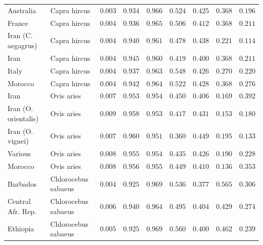 \documentclass{article}
\begin{document}
\begin{table}[tb]
\begin{adjustbox}{width=\textwidth}
\begin{tabular}{||l|l|r||r|r||r|r||r|r||}
                \rowcolor{LIGHTGREY} Australia            & Capra hircus        & $ 0.003$ & $ 0.934$ & $ 0.966$ & $ 0.524$ & $ 0.425$ & $ 0.368$ & $ 0.196$ \\
                \rowcolor{LIGHTGREY} France                                    & Capra hircus          & $ 0.004$ & $ 0.936$ & $ 0.965$ & $ 0.506$ & $ 0.412$ & $ 0.368$ & $ 0.211$ \\
                \rowcolor{LIGHTGREY} Iran (C. aegagrus)                    & Capra hircus          & $ 0.004$ & $ 0.940$ & $ 0.961$ & $ 0.478$ & $ 0.438$ & $ 0.221$ & $ 0.114$ \\
                \rowcolor{LIGHTGREY} Iran                        & Capra hircus          & $ 0.004$ & $ 0.945$ & $ 0.960$ & $ 0.419$ & $ 0.400$ & $ 0.368$ & $ 0.211$ \\
                \rowcolor{LIGHTGREY} Italy                                 & Capra hircus          & $ 0.004$ & $ 0.937$ & $ 0.963$ & $ 0.548$ & $ 0.426$ & $ 0.270$ & $ 0.220$ \\
                \rowcolor{LIGHTGREY} Morocco                                 & Capra hircus          & $ 0.004$ & $ 0.942$ & $ 0.964$ & $ 0.522$ & $ 0.428$ & $ 0.368$ & $ 0.276$ \\
                Iran           & Ovis aries & $ 0.007$ & $ 0.953$ & $ 0.954$ & $ 0.450$ & $ 0.406$ & $ 0.169$ & $ 0.392$ \\
                Iran (O. orientalis)  & Ovis aries & $ 0.009$ & $ 0.958$ & $ 0.953$ & $ 0.417$ & $ 0.431$ & $ 0.153$ & $ 0.180$ \\
                Iran (O. vignei)           & Ovis aries & $ 0.007$ & $ 0.960$ & $ 0.951$ & $ 0.360$ & $ 0.449$ & $ 0.195$ & $ 0.133$ \\
                Various             & Ovis aries & $ 0.008$ & $ 0.955$ & $ 0.954$ & $ 0.435$ & $ 0.426$ & $ 0.190$ & $ 0.228$ \\
                Morocco              & Ovis aries & $ 0.008$ & $ 0.956$ & $ 0.955$ & $ 0.449$ & $ 0.410$ & $ 0.136$ & $ 0.353$ \\
                \rowcolor{LIGHTGREY} Barbados              & Chlorocebus sabaeus & $ 0.004$ & $ 0.925$ & $ 0.969$ & $ 0.536$ & $ 0.377$ & $ 0.565$ & $ 0.306$ \\
                \rowcolor{LIGHTGREY} Central Afr. Rep.       & Chlorocebus sabaeus & $ 0.006$ & $ 0.940$ & $ 0.964$ & $ 0.495$ & $ 0.404$ & $ 0.429$ & $ 0.274$ \\
                \rowcolor{LIGHTGREY} Ethiopia        & Chlorocebus sabaeus & $ 0.005$ & $ 0.925$ & $ 0.969$ & $ 0.560$ & $ 0.400$ & $ 0.462$ & $ 0.239$ \\

\end{tabular}
\end{adjustbox}
\end{table}
\end{document}
